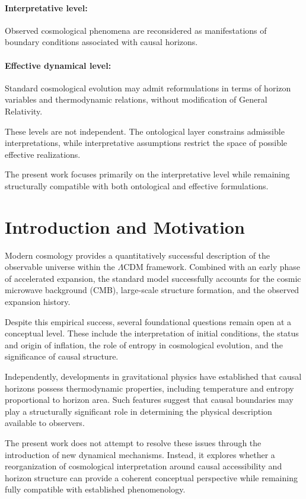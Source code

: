 \documentclass[12pt,a4paper]{article}
\begin{document}
\paragraph{Interpretative level:} Observed cosmological phenomena are reconsidered as manifestations of boundary conditions associated with causal horizons.

\paragraph{Effective dynamical level:} Standard cosmological evolution may admit reformulations in terms of horizon variables and thermodynamic relations, without modification of General Relativity.

These levels are not independent. The ontological layer constrains admissible interpretations, while interpretative assumptions restrict the space of possible effective realizations.

The present work focuses primarily on the interpretative level while remaining structurally compatible with both ontological and effective formulations.

\section{Introduction and Motivation}

Modern cosmology provides a quantitatively successful description of the observable universe within the $\Lambda$CDM framework. Combined with an early phase of accelerated expansion, the standard model successfully accounts for the cosmic microwave background (CMB), large-scale structure formation, and the observed expansion history.

Despite this empirical success, several foundational questions remain open at a conceptual level. These include the interpretation of initial conditions, the status and origin of inflation, the role of entropy in cosmological evolution, and the significance of causal structure.

Independently, developments in gravitational physics have established that causal horizons possess thermodynamic properties, including temperature and entropy proportional to horizon area. Such features suggest that causal boundaries may play a structurally significant role in determining the physical description available to observers.

The present work does not attempt to resolve these issues through the introduction of new dynamical mechanisms. Instead, it explores whether a reorganization of cosmological interpretation around causal accessibility and horizon structure can provide a coherent conceptual perspective while remaining fully compatible with established phenomenology.
\end{document}
